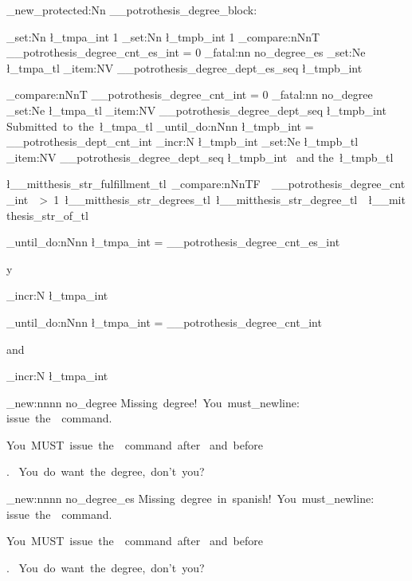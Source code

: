 \cs_new_protected:Nn \__potrothesis_degree_block: { %
	\int_set:Nn  \l_tmpa_int {1} %
	\int_set:Nn  \l_tmpb_int {1} %
	\ifmit@spanish
		\int_compare:nNnT { \g__potrothesis_degree_cnt_es_int } = {0}
			{ 
			\msg_fatal:nn { \ClassName } { no_degree_es }
			}
		\tl_set:Ne   \l_tmpa_tl { \seq_item:NV \g__potrothesis_degree_dept_es_seq \l_tmpb_int }
	
	\else
		\int_compare:nNnT { \g__potrothesis_degree_cnt_int } = {0}
			{ 
			\msg_fatal:nn { \ClassName } { no_degree }
			}	
		\tl_set:Ne   \l_tmpa_tl { \seq_item:NV \g__potrothesis_degree_dept_seq \l_tmpb_int }
		{Submitted\ to\ the\ \l_tmpa_tl} 
		\int_until_do:nNnn { \l_tmpb_int } = { \g__potrothesis_dept_cnt_int } {
			\int_incr:N  \l_tmpb_int
			\tl_set:Ne   \l_tmpb_tl { \seq_item:NV \g__potrothesis_degree_dept_seq \l_tmpb_int }
			\mbox {\ and}\linebreak
			\mbox {the\ \l_tmpb_tl }
		}
		\linebreak 
	\fi

    \mbox {\l__mitthesis_str_fulfillment_tl\space
		\int_compare:nNnTF { \g__potrothesis_degree_cnt_int } > {1} {\l__mitthesis_str_degrees_tl} {\l__mitthesis_str_degree_tl}
	\ \l__mitthesis_str_of_tl\ }
	\par

	\ifmit@spanish
		\int_until_do:nNnn { \l_tmpa_int } = { \g__potrothesis_degree_cnt_es_int } {
			\par y\par
			\int_incr:N     \l_tmpa_int
			}
		\par
	\else
		\int_until_do:nNnn { \l_tmpa_int } = { \g__potrothesis_degree_cnt_int } {
			\par and\par
			\int_incr:N     \l_tmpa_int
			}
		\par
	\fi
}

\msg_new:nnnn { \ClassName } { no_degree }
		{ Missing~degree!~You~must\iow_newline: issue~the~~command. 
		}{
		  You~MUST~issue~the~~command~after~\string\space
		  and~before~\string\maketitle.~ You~do~want~the~degree,~don't~you?
		}
\msg_new:nnnn { \ClassName } { no_degree_es }
		{ Missing~degree~in~spanish!~You~must\iow_newline: issue~the~~command. 
		}{
		  You~MUST~issue~the~~command~after~\string\space
		  and~before~\string\maketitle.~ You~do~want~the~degree,~don't~you?
		}


